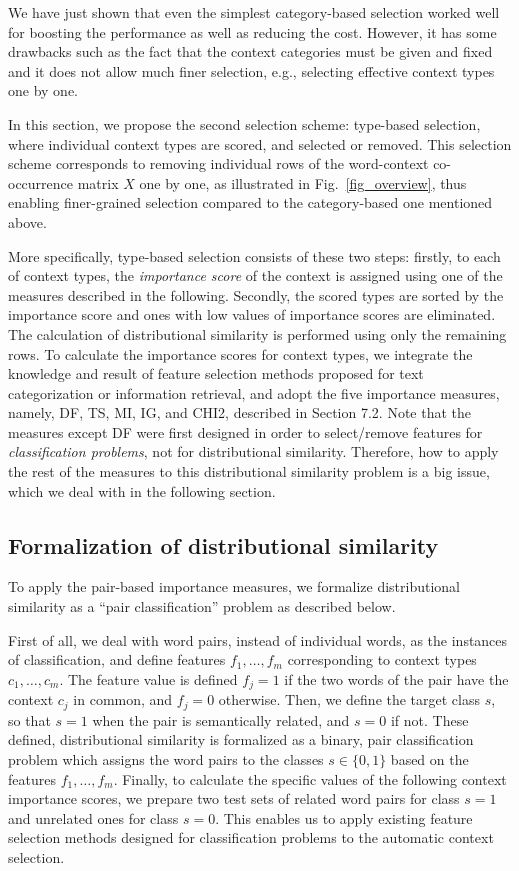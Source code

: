 \documentclass[english]{jnlp_1.4}
\begin{document}
We have just shown that even the simplest category-based selection
worked well for boosting the performance as well as reducing the
cost. However, it has some drawbacks such as the fact that the context
categories must be given and fixed and it does not allow much finer
selection, e.g., selecting effective context types one by one.

In this section, we propose the second selection scheme: type-based
selection, where individual context types are scored, and selected or
removed. This selection scheme corresponds to removing individual rows
of the word-context co-occurrence matrix $X$ one by one, as
illustrated in Fig.~\ref{fig_overview}, thus enabling finer-grained
selection compared to the category-based one mentioned above.

More specifically, type-based selection consists of these two steps:
firstly, to each of context types, the {\em importance score} of the
context is assigned using one of the measures described in the
following. Secondly, the scored types are sorted by the importance
score and ones with low values of importance scores are
eliminated. The calculation of distributional similarity is performed
using only the remaining rows. To calculate the importance scores for
context types, we integrate the knowledge and result of feature
selection methods proposed for text categorization or information
retrieval, and adopt the five importance measures, namely, DF, TS, MI,
IG, and CHI2, described in Section 7.2. Note that the measures except
DF were first designed in order to select/remove features for {\em
classification problems}, not for distributional
similarity. Therefore, how to apply the rest of the measures to this
distributional similarity problem is a big issue, which we deal with
in the following section.

\subsection{Formalization of distributional similarity}

To apply the pair-based importance measures, we formalize
distributional similarity as a ``pair classification'' problem as
described below.

First of all, we deal with word pairs, instead of individual words, as
the instances of classification, and define features $f_1, \ldots , f_m$
corresponding to context types $c_1, \ldots , c_m$. The feature value is
defined $f_j = 1$ if the two words of the pair have the context $c_j$
in common, and $f_j = 0$ otherwise. Then, we define the target class
$s$, so that $s = 1$ when the pair is semantically related, and $s =
0$ if not. These defined, distributional similarity is formalized as a
binary, pair classification problem which assigns the word pairs to
the classes $s \in \{0, 1\}$ based on the features $f_1, \ldots ,
f_m$. Finally, to calculate the specific values of the following
context importance scores, we prepare two test sets of related word
pairs for class $s = 1$ and unrelated ones for class $s = 0$. This
enables us to apply existing feature selection methods designed for
classification problems to the automatic context selection.
\end{document}
